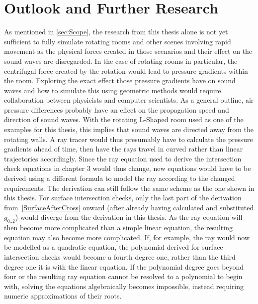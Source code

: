 \chapter{Outlook and Further Research}\label{ch:Outlook}

As mentioned in \autoref{sec:Scope},
the research from this thesis alone is not yet sufficient to fully simulate rotating rooms
and other scenes involving rapid movement
as the physical forces created in those scenarios and their effect on the sound waves are disregarded.
\newline
In the case of rotating rooms in particular,
the centrifugal force created by the rotation would lead to pressure gradients within the room.
Exploring the exact effect those pressure gradients have on sound waves
and how to simulate this using geometric methods would require collaboration between physicists and computer scientists.
\newline
As a general outline, air pressure differences probably have an effect on the propagation speed and direction of sound waves.
With the rotating L-Shaped room used as one of the examples for this thesis,
this implies that sound waves are directed away from the rotating walls.
A ray tracer would thus presumably have to calculate the pressure gradients ahead of time,
then have the rays travel in curved rather than linear trajectories accordingly.
\newline
Since the ray equation used to derive the intersection check equations in chapter 3 would thus change,
new equations would have to be derived using a different formula to model the ray according to the changed requirements.
The derivation can still follow the same scheme as the one shown in this thesis.
For surface intersection checks, only the last part of the derivation from~\eqref{SurfaceAfterCross} onward
(after already having calculated and substituted \(g_{0..2}\)) would diverge from the derivation in this thesis.
\newline
As the ray equation will then become more complicated than a simple linear equation,
the resulting equation may also become more complicated.
If, for example, the ray would now be modelled as a quadratic equation,
the polynomial derived for surface intersection checks would become a fourth degree one,
rather than the third degree one it is with the linear equation.
If the polynomial degree goes beyond four
or the resulting ray equation cannot be resolved to a polynomial to begin with,
solving the equations algebraically becomes impossible,
instead requiring numeric approximations of their roots.
